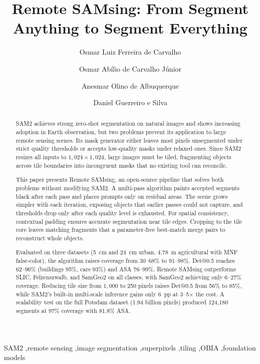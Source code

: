 \documentclass[review,11pt,authoryear]{elsarticle}
\begin{document}
\begin{frontmatter}

\title{Remote SAMsing: From Segment Anything to Segment Everything}

\author[ee]{Osmar Luiz Ferreira de Carvalho}

\author[geo]{Osmar Ab\'{i}lio de Carvalho J\'{u}nior}

\author[geo]{Anesmar Olino de Albuquerque}

\author[ee]{Daniel Guerreiro e Silva}

\address[ee]{Department of Electrical Engineering, University of Bras\'{i}lia, Bras\'{i}lia, Brazil}
\address[geo]{Department of Geography, University of Bras\'{i}lia, Bras\'{i}lia, Brazil}

\begin{abstract}
SAM2 achieves strong zero-shot segmentation on natural images and shows increasing adoption in Earth observation, but two problems prevent its application to large remote sensing scenes. Its mask generator either leaves most pixels unsegmented under strict quality thresholds or accepts low-quality masks under relaxed ones. Since SAM2 resizes all inputs to $1{,}024 \times 1{,}024$, large images must be tiled, fragmenting objects across tile boundaries into incongruent masks that no existing tool can reconcile.

This paper presents Remote SAMsing, an open-source pipeline that solves both problems without modifying SAM2. A multi-pass algorithm paints accepted segments black after each pass and places prompts only on residual areas. The scene grows simpler with each iteration, exposing objects that earlier passes could not capture, and thresholds drop only after each quality level is exhausted. For spatial consistency, contextual padding ensures accurate segmentation near tile edges. Cropping to the tile core leaves matching fragments that a parameter-free best-match merge pairs to reconstruct whole objects.

Evaluated on three datasets (5~cm and 24~cm urban, 4.78~m agricultural with MNF false-color), the algorithm raises coverage from 30--68\% to 91--98\%. Det@0.5 reaches 62--96\% (buildings 95\%, cars 93\%) and ASA 76--99\%. Remote SAMsing outperforms SLIC, Felzenszwalb, and SamGeo2 on all classes, with SamGeo2 achieving only 6--27\% coverage. Reducing tile size from $1{,}000$ to 250 pixels raises Det@0.5 from 56\% to 85\%, while SAM2's built-in multi-scale inference gains only 6~pp at 3--5$\times$ the cost. A scalability test on the full Potsdam dataset (1.94 billion pixels) produced 124{,}180 segments at 97\% coverage with 81.8\% ASA.
\end{abstract}

\begin{keyword}
SAM2 \sep remote sensing \sep image segmentation \sep superpixels \sep tiling \sep OBIA \sep foundation models
\end{keyword}

\end{frontmatter}
\end{document}
